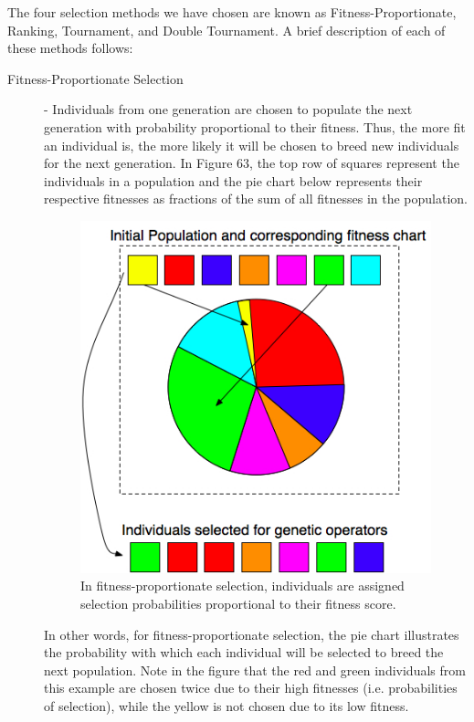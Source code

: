 \documentclass[12pt]{report} 	%
\numberwithin{figure}{chapter}
\numberwithin{table}{chapter}
\numberwithin{equation}{chapter}
\begin{document}
\begin{flushleft}
The four selection methods we have chosen are known as Fitness-Proportionate, Ranking, Tournament, and Double Tournament. A brief description of each of these methods follows:
\begin{description}
\item [Fitness-Proportionate Selection] - Individuals from one generation are chosen to populate the next generation with probability proportional to their fitness. Thus, the more fit an individual is, the more likely it will be chosen to breed new individuals for the next generation. In Figure 63, the top row of squares represent the individuals in a population and the pie chart below represents their respective fitnesses as fractions of the sum of all fitnesses in the population. 
\begin{figure}[h!]
\vspace{24pt}
\begin{center}
\includegraphics[scale = 0.7]{PieChartSelection}
\caption[Fitness-proportionate selection]{In fitness-proportionate selection, individuals are assigned selection probabilities proportional to their fitness score.}
\end{center}
\vspace{6pt}
\end{figure}
In other words, for fitness-proportionate selection, the pie chart illustrates the probability with which each individual will be selected to breed the next population. Note in the figure that the red and green individuals from this example are chosen twice due to their high fitnesses (i.e. probabilities of selection), while the yellow is not chosen due to its low fitness.


\end{description}
\end{flushleft}
\end{document}
